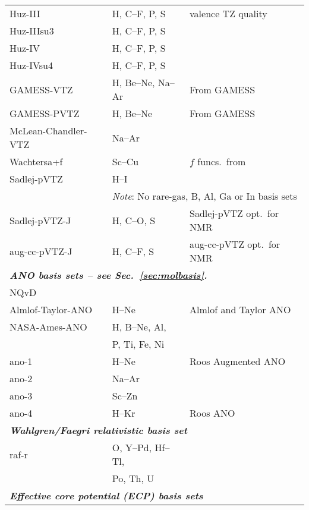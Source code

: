 \begin{longtable}{lll}
Huz-III & H, C--F, P, S & \cite{wkijc19,mswkjcp76,huzinagaintern} valence TZ quality\\
Huz-IIIsu3 & H, C--F, P, S & \cite{wkijc19,mswkjcp76,huzinagaintern}\\
Huz-IV & H, C--F, P, S & \cite{wkijc19,mswkjcp76,huzinagaintern}\\
Huz-IVsu4 & H, C--F, P, S & \cite{wkijc19,mswkjcp76,huzinagaintern}\\
\hline
GAMESS-VTZ & H, Be--Ne, Na--Ar & \cite{thdjcp55,admgscjcp72,ajhwjcp52} From GAMESS \\
GAMESS-PVTZ & H, Be--Ne & \cite{thdjcp55,admgscjcp72,ajhwjcp52} From GAMESS \\
%
McLean-Chandler-VTZ & Na--Ar & \cite{admgscjcp72} \\
Wachtersa+f & Sc--Cu & \cite{ajhwjcp52,wachterintern1969} $f$ funcs.\ from \cite{cwbsrllabjcp91} \\
Sadlej-pVTZ & H--I & \cite{ajstca79,ajsmujmst234,ajstca81,ajstca81-2} \\
  & \multicolumn{2}{l}{\emph{Note}: No rare-gas, B, Al, Ga or In basis sets} \\
%
Sadlej-pVTZ-J & H, C--O, S & \cite{pfpgaaspasjcp115} Sadlej-pVTZ opt.\ for NMR \\
aug-cc-pVTZ-J & H, C--F, S & \cite{pfpgaaspasjcp115} aug-cc-pVTZ opt.\ for NMR \\
\hline
\multicolumn{3}{l}{\bf{\emph{ANO basis sets\index{basis!ANO} -- see Sec.~\ref{sec:molbasis}.}}} \\
NQvD & & \cite{nqvdref} \\
Almlof-Taylor-ANO & H--Ne & \cite{japrtjcp86} Almlof and Taylor ANO \\
NASA-Ames-ANO & H, B--Ne, Al, & \cite{japrtjcp86,cwbsrlaktca77} \\
  & P, Ti, Fe, Ni & \\
ano-1 & H--Ne & \cite{powpambortca77} Roos Augmented ANO\\
ano-2 & Na--Ar & \cite{powbjpbortca79} \\
ano-3 & Sc--Zn & \cite{rpamminpowbortca92} \\
ano-4 & H--Kr & \cite{kpbdpowbortca90} Roos ANO\\
\hline
\multicolumn{3}{l}{\bf{\emph{Wahlgren/Faegri relativistic basis set}}} \\
raf-r & O, Y--Pd, Hf--Tl, & \\
 & Po, Th, U & \\
\hline
\multicolumn{3}{l}{\bf{\emph{Effective core potential (ECP) basis sets}}} \\

\end{longtable}
